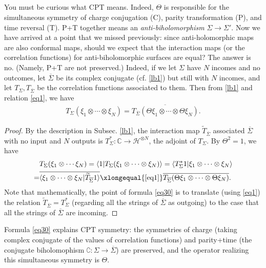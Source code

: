 \documentclass[11pt,b5paper,notitlepage]{article}
\theoremstyle{definition}
\theoremstyle{plain}
\newcommand{\mc}{\mathcal}
\newcommand{\wtd}{\widetilde}
\newcommand{\ovl}{\overline}
\newcommand{\bk}[1]{\langle {#1}\rangle}
\newcommand{\Co}{\complement}
\newcommand{\Cbb}{\mathbb C}
\numberwithin{equation}{section}
\begin{document}
\subsection{}

You must be curious what CPT means. Indeed, $\Theta$ is responsible for the simultaneous symmetry of charge conjugation (C), parity transformation (P), and time reversal (T). P+T together means  an \emph{anti-biholomorphism} $\Sigma\rightarrow\Sigma'$. Now we have arrived at a point that we missed previously: since anti-holomorphic maps are also conformal maps, should we expect that the interaction maps (or the correlation functions) for   anti-biholomorphic surfaces are equal? The answer is no. (Namely, P+T are not preserved.) Indeed, if we let $\Sigma$ have $N$ incomes and no outcomes, let $\ovl\Sigma$ be its complex conjugate (cf. \ref{lb1}) but still with $N$ incomes, and let $T_\Sigma,T_{\ovl\Sigma}$ be the correlation functions associated to them. Then from \ref{lb1} and relation \eqref{eq1}, we have 
\begin{align}
T_\Sigma(\xi_1\otimes\cdots\otimes\xi_N)=\ovl{T_{\ovl\Sigma}(\Theta\xi_1\otimes\cdots\otimes\Theta\xi_N)}.\label{eq30}	
\end{align}

\begin{proof}
By the description in Subsec. \ref{lb1}, the interaction map $\wtd T_{\ovl\Sigma}$ associated $\ovl\Sigma$ with no input and $N$ outputs is $T_\Sigma^*:\Cbb\rightarrow\mc H^{\otimes N}$, the adjoint of $T_\Sigma$. By  $\Theta^2=1$, we have
\begin{align*}
&T_\Sigma(\xi_1\otimes\cdots\xi_N)=\bk{1|T_\Sigma(\xi_1\otimes\cdots\otimes\xi_N)}=\bk{T_\Sigma^*1|\xi_1\otimes\cdots\otimes\xi_N}\\
=&\ovl{\bk{\xi_1\otimes\cdots\otimes \xi_N|\wtd T_{\ovl\Sigma}1}}\xlongequal{\eqref{eq1}}\ovl{T_{\ovl\Sigma}(\Theta\xi_1\otimes\cdots\otimes\Theta\xi_N)}.	
\end{align*}
Note that mathematically, the point of formula \eqref{eq30} is to translate (using \eqref{eq1}) the relation $\wtd T_{\ovl\Sigma}=T_\Sigma^*$ (regarding all the strings of $\ovl\Sigma$ as outgoing) to the case that all the strings of $\ovl\Sigma$ are incoming. 
\end{proof}
Formula \eqref{eq30} explains CPT symmetry: the symmetries of charge (taking complex conjugate of the values of correlation functions) and parity+time (the conjugate biholomophism $\Co:\Sigma\rightarrow\ovl\Sigma$) are preserved, and the operator realizing this simultaneous symmetry is $\Theta$.
\end{document}
